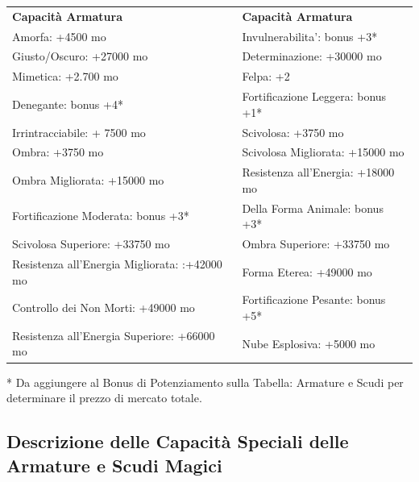\documentclass[a4paper,11pt,twoside,openany]{book}
\begin{document}
\begin{tabular}{ll}
	\toprule
	\textbf{Capacità Armatura}             & \textbf{Capacità Armatura}\\
	Amorfa:\index{Amorfa} +4500 mo         & Invulnerabilita'\index{Invulnerabilita'}: bonus +3{*}\\
	Giusto/Oscuro:\index{Giusto/Oscuro:} +27000 mo         & Determinazione\index{Determinazione}: +30000 mo\\
	Mimetica: \index{Mimetica}+2.700 mo    & Felpa\index{Felpa}: +2\\
	Denegante:\index{Denegante} bonus +4{*}& Fortificazione Leggera\index{Fortificazione Leggera}: bonus +1{*}\\
	Irrintracciabile:\index{Irrintracciabile} + 7500 mo    & Scivolosa\index{Scivolosa}: +3750 mo\\
	Ombra: \index{Ombra}+3750 mo           & Scivolosa Migliorata\index{Scivolosa Migliorata}: +15000 mo\\
	Ombra Migliorata:\index{Ombra Migliorata} +15000 mo    & Resistenza all'Energia: \index{Resistenza all'Energia}+18000 mo\\
	Fortificazione Moderata: \index{Fortificazione Moderata}bonus +3{*}    & Della Forma Animale\index{Della Forma Animale}: bonus +3{*}\\
	Scivolosa Superiore:\index{Scivolosa Superiore} +33750 mo              & Ombra Superiore: \index{Ombra Superiore}+33750 mo\\
	Resistenza all'Energia Migliorata: \index{Resistenza all'Energia Migliorata}:+42000 mo & Forma Eterea\index{Forma Eterea}: +49000 mo\\
	Controllo dei Non Morti:\index{Controllo dei Non Morti} +49000 mo      & Fortificazione Pesante:\index{Fortificazione Pesante} bonus +5{*}\\
	Resistenza all'Energia Superiore\index{Resistenza all'Energia Superiore}: +66000 mo    & Nube Esplosiva\index{Nube Esplosiva}: +5000 mo\\
\end{tabular}

{*} Da aggiungere al Bonus di Potenziamento sulla Tabella: Armature
e Scudi per determinare il prezzo di mercato totale.



\subsection{Descrizione delle Capacità Speciali delle Armature e Scudi Magici}
\end{document}
